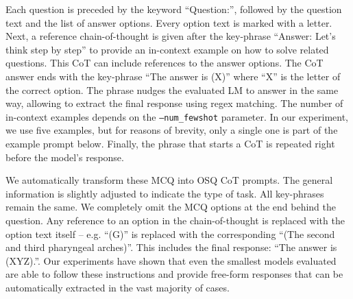 Each question is preceded by the keyword ``Question:'', followed by the question text and the list of answer options. Every option text is marked with a letter. Next, a reference chain-of-thought is given after the key-phrase ``Answer: Let's think step by step'' to provide an in-context example on how to solve related questions. This CoT can include references to the answer options. The CoT answer ends with the key-phrase ``The answer is (X)'' where ``X'' is the letter of the correct option. The phrase nudges the evaluated LM to answer in the same way, allowing to extract the final response using regex matching. The number of in-context examples depends on the \texttt{--num\_fewshot} parameter. In our experiment, we use five examples, but for reasons of brevity, only a single one is part of the example prompt below. Finally, the phrase that starts a CoT is repeated right before the model's response.

We automatically transform these MCQ into OSQ CoT prompts. The general information is slightly adjusted to indicate the type of task. All key-phrases remain the same. We completely omit the MCQ options at the end behind the question. Any reference to an option in the chain-of-thought is replaced with the option text itself -- e.g. ``(G)'' is replaced with the corresponding ``(The second and third pharyngeal arches)''. This includes the final response: ``The answer is (XYZ).''. Our experiments have shown that even the smallest models evaluated are able to follow these instructions and provide free-form responses that can be automatically extracted in the vast majority of cases. 


